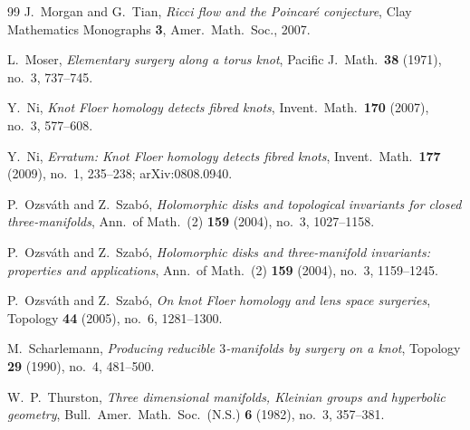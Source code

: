 \documentclass[11pt]{article}
\theoremstyle{definition}
\theoremstyle{remark}
\begin{document}
\begin{thebibliography}{99}
J.~Morgan and G.~Tian,
\emph{Ricci flow and the Poincar\'e conjecture},
Clay Mathematics Monographs \textbf{3}, Amer.\ Math.\ Soc., 2007.

L.~Moser,
\emph{Elementary surgery along a torus knot},
Pacific J.\ Math.\ \textbf{38} (1971), no.~3, 737--745.

Y.~Ni,
\emph{Knot Floer homology detects fibred knots},
Invent.\ Math.\ \textbf{170} (2007), no.~3, 577--608.

Y.~Ni,
\emph{Erratum: Knot Floer homology detects fibred knots},
Invent.\ Math.\ \textbf{177} (2009), no.~1, 235--238; arXiv:0808.0940.

P.~Ozsv\'ath and Z.~Szab\'o,
\emph{Holomorphic disks and topological invariants for closed
three-manifolds},
Ann.\ of Math.\ (2) \textbf{159} (2004), no.~3, 1027--1158.

P.~Ozsv\'ath and Z.~Szab\'o,
\emph{Holomorphic disks and three-manifold invariants: properties and
applications},
Ann.\ of Math.\ (2) \textbf{159} (2004), no.~3, 1159--1245.

P.~Ozsv\'ath and Z.~Szab\'o,
\emph{On knot Floer homology and lens space surgeries},
Topology \textbf{44} (2005), no.~6, 1281--1300.

M.~Scharlemann,
\emph{Producing reducible \(3\)-manifolds by surgery on a knot},
Topology \textbf{29} (1990), no.~4, 481--500.

W.~P.~Thurston,
\emph{Three dimensional manifolds, Kleinian groups and hyperbolic
geometry},
Bull.\ Amer.\ Math.\ Soc.\ (N.S.) \textbf{6} (1982), no.~3, 357--381.

\end{thebibliography}
\end{document}
